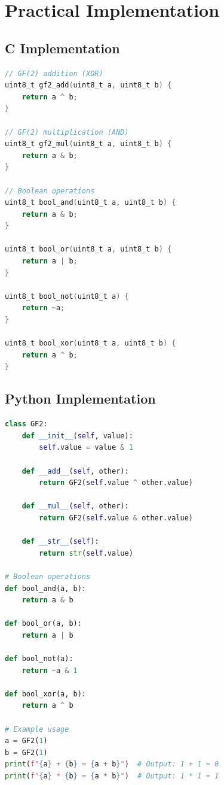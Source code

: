 \documentclass[11pt,a4paper]{article}
\begin{document}
\section{Practical Implementation}

\subsection{C Implementation}

\begin{lstlisting}[language=C, caption=GF$(2)$ Operations in C]
// GF(2) addition (XOR)
uint8_t gf2_add(uint8_t a, uint8_t b) {
    return a ^ b;
}

// GF(2) multiplication (AND)
uint8_t gf2_mul(uint8_t a, uint8_t b) {
    return a & b;
}

// Boolean operations
uint8_t bool_and(uint8_t a, uint8_t b) {
    return a & b;
}

uint8_t bool_or(uint8_t a, uint8_t b) {
    return a | b;
}

uint8_t bool_not(uint8_t a) {
    return ~a;
}

uint8_t bool_xor(uint8_t a, uint8_t b) {
    return a ^ b;
}
\end{lstlisting}

\subsection{Python Implementation}

\begin{lstlisting}[language=Python, caption=GF$(2)$ Operations in Python]
class GF2:
    def __init__(self, value):
        self.value = value & 1
    
    def __add__(self, other):
        return GF2(self.value ^ other.value)
    
    def __mul__(self, other):
        return GF2(self.value & other.value)
    
    def __str__(self):
        return str(self.value)

# Boolean operations
def bool_and(a, b):
    return a & b

def bool_or(a, b):
    return a | b

def bool_not(a):
    return ~a & 1

def bool_xor(a, b):
    return a ^ b

# Example usage
a = GF2(1)
b = GF2(1)
print(f"{a} + {b} = {a + b}")  # Output: 1 + 1 = 0
print(f"{a} * {b} = {a * b}")  # Output: 1 * 1 = 1
\end{lstlisting}
\end{document}
